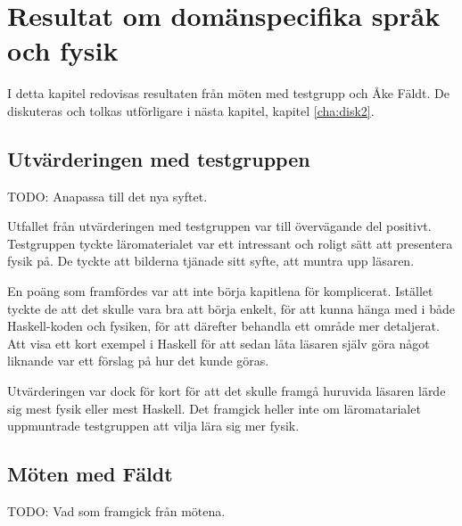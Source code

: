 
\chapter{Resultat om domänspecifika språk och fysik}

\begin{draft}

I detta kapitel redovisas resultaten från möten med testgrupp och Åke Fäldt. De diskuteras och tolkas utförligare i nästa kapitel, kapitel \ref{cha:disk2}.

\section{Utvärderingen med testgruppen}

TODO: Anapassa till det nya syftet.

Utfallet från utvärderingen med testgruppen var till övervägande del positivt. Testgruppen tyckte läromaterialet var ett intressant och roligt sätt att presentera fysik på. De tyckte att bilderna tjänade sitt syfte, att muntra upp läsaren. 

En poäng som framfördes var att inte börja kapitlena för komplicerat. Istället tyckte de att det skulle vara bra att börja enkelt, för att kunna hänga med i både Haskell-koden och fysiken, för att därefter behandla ett område mer detaljerat. Att visa ett kort exempel i Haskell för att sedan låta läsaren själv göra något liknande var ett förslag på hur det kunde göras.

Utvärderingen var dock för kort för att det skulle framgå huruvida läsaren lärde sig mest fysik eller mest Haskell. Det framgick heller inte om läromatarialet uppmuntrade testgruppen att vilja lära sig mer fysik.

\section{Möten med Fäldt}

TODO: Vad som framgick från mötena.

\end{draft}






























